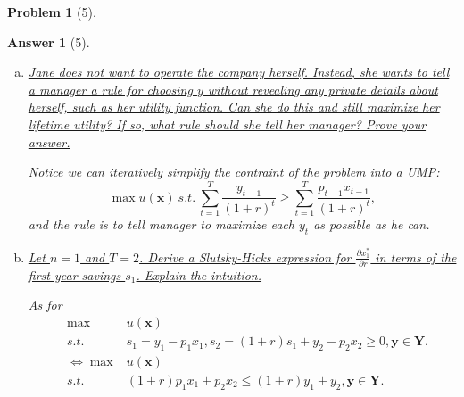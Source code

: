\documentclass{article}
\newtheorem*{ans}{Answer}
\newtheorem*{prob}{{\bf Problem}}
\newcommand{\1}{{\bf 1}}
\newcommand{\0}{{\mathbf{0}}}
\newcommand{\x}{{\mathbf{x}}}
\newcommand{\y}{{\mathbf{y}}}
\newcommand{\Y}{{\mathbf{Y}}}
\newcommand{\<}{\langle}
\renewcommand{\>}{\rangle}
\begin{document}
\begin{prob}[5]
\end{prob}
\begin{ans}[5]
	\begin{enumerate}[(a)]
		\item \ul{Jane does not want to operate the company herself. Instead, she wants to tell a manager a rule for choosing $y$ without revealing any private details about herself, such as her utility function. Can she do this and still maximize her lifetime utility? If so, what rule should she tell her manager? Prove your answer.}
		
		Notice we can iteratively simplify the contraint of the problem into a UMP:
		$$ \max_{  }u(\x) ~ s.t. ~\sum_{t=1}^T  \frac{y_{t- 1}}{(1+r)^t } \ge \sum_{t=1}^T \frac{p_{t- 1} x_{t- 1}}{(1+r)^t}, $$
		and the rule is to tell manager to maximize each $y_t$ as possible as he can.
		\item  \ul{Let $n = 1$ and $T = 2$. Derive a Slutsky-Hicks expression for $\frac{\partial x_1^*}{\partial r}$ in terms of the first-year savings $s_1$. Explain the intuition.}
		
		As for \begin{eqnarray*}
		&\max & u(\x)  \\
		& s.t.&s_1 = y_1 - p_1 x_1,s_2 = (1+r) s_1 + y_2 -p_2 x_2   \ge 0, \y \in \Y. \\
		&\Leftrightarrow \max &  u(\x)  \\
		& s.t.& (1+r) p_1 x_1 + p_2 x_2\le  (1+r) y_1 + y_2, \y \in \Y .
		\end{eqnarray*}
	\end{enumerate}
\end{ans}
\end{document}
